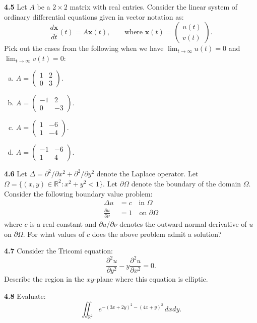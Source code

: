\documentclass[11pt,a4paper]{article}
\newcommand{\R}{\mathbb{R}}
\newcommand{\qitem}[1]{\par\medskip\noindent\textbf{#1}\hspace{0.5em}}
\begin{document}
\qitem{4.5} Let $A$ be a $2 \times 2$ matrix with real entries. Consider the linear system of ordinary differential equations given in vector notation as:
\[
  \frac{d\mathbf{x}}{dt}(t) = A\mathbf{x}(t), \qquad \text{where } \mathbf{x}(t) = \begin{pmatrix} u(t) \\ v(t) \end{pmatrix}.
\]
Pick out the cases from the following when we have $\lim_{t \to \infty} u(t) = 0$ and $\lim_{t \to \infty} v(t) = 0$:
\begin{enumerate}[a.]
  \item $A = \begin{pmatrix} 1 & 2 \\ 0 & 3 \end{pmatrix}$.
  \item $A = \begin{pmatrix} -1 & 2 \\ 0 & -3 \end{pmatrix}$.
  \item $A = \begin{pmatrix} 1 & -6 \\ 1 & -4 \end{pmatrix}$.
  \item $A = \begin{pmatrix} -1 & -6 \\ 1 & 4 \end{pmatrix}$.
\end{enumerate}

\qitem{4.6} Let $\Delta = \partial^2/\partial x^2 + \partial^2/\partial y^2$ denote the Laplace operator. Let $\Omega = \{(x, y) \in \R^2 : x^2 + y^2 < 1\}$. Let $\partial\Omega$ denote the boundary of the domain $\Omega$. Consider the following boundary value problem:
\begin{align*}
  \Delta u &= c \quad \text{in } \Omega \\
  \frac{\partial u}{\partial \nu} &= 1 \quad \text{on } \partial\Omega
\end{align*}
where $c$ is a real constant and $\partial u/\partial \nu$ denotes the outward normal derivative of $u$ on $\partial\Omega$. For what values of $c$ does the above problem admit a solution?

\qitem{4.7} Consider the Tricomi equation:
\[
  \frac{\partial^2 u}{\partial y^2} - y \frac{\partial^2 u}{\partial x^2} = 0.
\]
Describe the region in the $xy$-plane where this equation is elliptic.

\qitem{4.8} Evaluate:
\[
  \iint_{\R^2} e^{-(3x+2y)^2 - (4x+y)^2}\,dxdy.
\]
\end{document}
